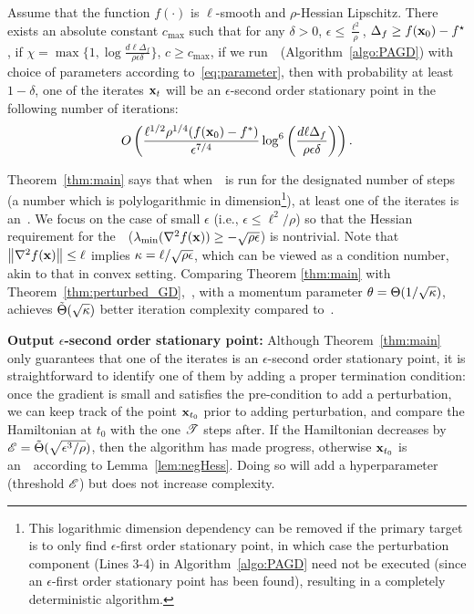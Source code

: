 \begin{theorem}\label{thm:main}
Assume that the function $f(\cdot)$ is $\ell$-smooth and $\rho$-Hessian Lipschitz.  There exists an absolute constant $c_{\max}$ such that for any $\delta >0$, $\epsilon \le \frac{\ell^2}{\rho}$, $\Delta_f \ge f(\mathbf{x}_0) - f^\star$, if $\chi =\max\{1, \log \frac{d \ell\Delta_f}{\rho \epsilon\delta}\}$, $c\ge c_{\max}$, if we run~\pagd~(Algorithm~\ref{algo:PAGD}) with choice of parameters according to~\eqref{eq:parameter}, then with probability at least $1-\delta$, one of the iterates $\mathbf{x}_t$ will be an $\epsilon$-second order stationary point
in the following number of iterations:
\begin{equation*}
O\left(\frac{\ell^{1/2}\rho^{1/4}(f(\mathbf{x}_0) - f^*)}{\epsilon^{7/4}} \log^6 \left(\frac{d \ell\Delta_f}{\rho \epsilon\delta}\right)\right).
\end{equation*}
\end{theorem}
\noindent
Theorem~\ref{thm:main} says that when~\pagd~is run for the designated number of steps 
(a number which is polylogarithmic in dimension\footnote{This logarithmic dimension 
dependency can be removed if the primary target is to only find $\epsilon$-first order 
stationary point, in which case the perturbation component (Lines 3-4) in 
Algorithm~\ref{algo:PAGD} need not be executed (since an $\epsilon$-first order stationary point has been found), resulting in a completely deterministic algorithm.}), 
at least one of the iterates is an~\ESSP. We focus on the case of small $\epsilon$ (i.e., $\epsilon \le \ell^2/\rho$) so that the Hessian requirement for the~\ESSP~($\lambda_{\min}(\nabla^2 f(\mathbf{x})) \ge -\sqrt{\rho \epsilon}$) is nontrivial.
Note that $\left\|{\nabla^2 f(\mathbf{x})}\right\| \le \ell$ implies $\kappa = \ell/\sqrt{\rho\epsilon}$,
which can be viewed as a condition number, akin to that in convex setting.
Comparing Theorem \ref{thm:main} with Theorem~\ref{thm:perturbed_GD},~\pagd, with a momentum parameter $\theta = \Theta(1/\sqrt{\kappa})$, achieves $\tilde{\Theta}(\sqrt{\kappa})$ better iteration complexity compared to~\pgd. 

\vspace{0.2cm}

\noindent\textbf{Output $\epsilon$-second order stationary point:}
Although Theorem~\ref{thm:main} only guarantees that one of the iterates is an $\epsilon$-second order stationary point, it is straightforward to identify one of them by adding a proper termination condition: once the gradient is small and satisfies the pre-condition to add a perturbation, we can keep track of the point $\mathbf{x}_{t_0}$ prior to adding perturbation, and compare the Hamiltonian at $t_0$ with the one $\mathscr{T}$ steps after. If the Hamiltonian decreases by $\mathscr{E} = \tilde{\Theta}(\sqrt{\epsilon^3/\rho})$, then the algorithm has made progress, otherwise $\mathbf{x}_{t_0}$ is an~\ESSP~according to Lemma~\ref{lem:negHess}. Doing so will add a hyperparameter (threshold $\mathscr{E}$) but does not increase complexity.


